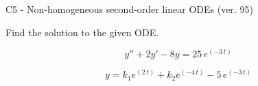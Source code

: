 \begin{exercise}
  \begin{exerciseTitle}C5 - Non-homogeneous second-order linear ODEs (ver. 95)\end{exerciseTitle}
  \begin{exerciseStatement}
    
Find the solution to the given ODE.

    
\[y''+2y'-8y = 25 \, e^{\left(-3 \, t\right)}\]

  \end{exerciseStatement}
  \begin{exerciseAnswer}
    
\[y= k_{1} e^{\left(2 \, t\right)} + k_{2} e^{\left(-4 \, t\right)} - 5 \, e^{\left(-3 \, t\right)}\]

  \end{exerciseAnswer}
\end{exercise}